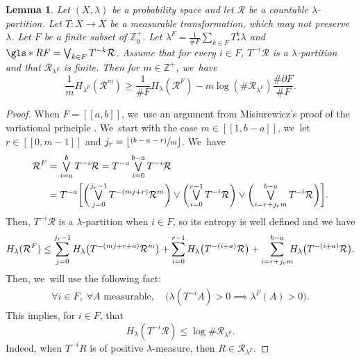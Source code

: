\documentclass[JEP,XML,SOM,Unicode,NoFloatCountersInSection,published]{cedram}
\let\oldbigvee\bigvee
\renewcommand{\bigvee}{\mathop{\textstyle\oldbigvee}\displaylimits}
\newcommand{\psfrac}[2]{\sfrac{(#1)}{#2}}
\newtheorem{lem}[thm]{Lemma}
\theoremstyle{definition}
\newcommand{\bbZ}{{\mathbb{Z}}}
\begin{document}
\begin{lem}
\label{lem:Misiurewicz}
Let $(X, \lambda)$ be a probability space and let $\mathcal{R}$ be a countable $\lambda$-partition. Let $T : X \to X$ be a measurable transformation, which may not preserve $\lambda$. Let $F$ be a finite subset of $\bbZ_0^+$.
Let $\lambda^F = \frac{1}{\# F} \sum_{k \in F} T^k_* \lambda$ and $\gls*{RF} = \bigvee_{k \in F} T^{-k} \mathcal{R}$.
Assume that for every $i \in F$, $T^{-i} \mathcal{R}$ is a $\lambda$-partition and that $\mathcal{R}_{\lambda^F}$ is finite.
Then for $m \in \bbZ^+$, we~have
\[
\frac{1}{m} H_{\lambda^F} (\mathcal{R}^m) \geq \frac{1}{\# F} H_{\lambda}(\mathcal{R}^F) - m \log (\# \mathcal{R}_{\lambda^F}) \frac{\# \partial F}{\# F}.
\]
\end{lem}
\begin{proof}
When $F = [\![ a, b ]\!]$, we~use an argument from Misiurewicz's proof of the variational principle \cite{Misiurewicz1976}. We~start with the case $m \in [\![ 1, b-a ]\!]$, we~let $r \in [\![ 0, m-1 ]\!]$ and $j_r = \lfloor \psfrac{b-a - r}{m} \rfloor$. We~have
\begin{align*}
\mathcal{R}^F &= \bigvee_{i=a}^b T^{-i} \mathcal{R}
= T^{-a} \bigvee_{i=0}^{b-a} T^{-i} \mathcal{R}\\
&=T^{-a} \biggl [ \biggl (\bigvee_{j=0}^{j_r - 1} T^{-(mj + r)} \mathcal{R}^m \biggr)
\vee \biggl (\bigvee_{i=0}^{r-1} T^{-i} \mathcal{R} \biggr)
\vee \biggl (\bigvee_{i=r+j_r m}^{b-a} T^{-i} \mathcal{R} \biggr) \biggr ].
\end{align*}
Then, $T^{-i} \mathcal{R}$ is a $\lambda$-partition when $i \in F$, so its entropy is well defined and we have
\begin{align*}
H_{\lambda}(\mathcal{R}^F)
\leq \sum_{j=0}^{j_r - 1} H_{\lambda} \bigl (T^{-(mj + r+a)} \mathcal{R}^m \bigr)
+ \sum_{i=0}^{r-1} H_{\lambda} \bigl (T^{-(i+a)} \mathcal{R} \bigr)
+ \sum_{i=r+j_r m}^{b-a}\hspace*{-2mm} H_{\lambda} \bigl (T^{-(i+a)} \mathcal{R} \bigr).
\end{align*}
Then, we~will use the following fact:\enlargethispage{-2\baselineskip}
\begin{align}
\forall i \in F,\; \forall A \text{ measurable},\quad \bigl (\lambda(T^{-i} A) > 0 \implies \lambda^F(A) > 0 \bigr).
\tag{$**$}
\label{link-emp-meas}
\end{align}
This implies, for $i \in F$, that
\[
H_{\lambda}(T^{-i} \mathcal{R}) \leq \log \# \mathcal{R}_{\lambda^F}.
\]
Indeed, when $T^{-i} R$ is of positive $\lambda$-measure, then $R \in \mathcal{R}_{\lambda^F}$.

\end{proof}
\end{document}
